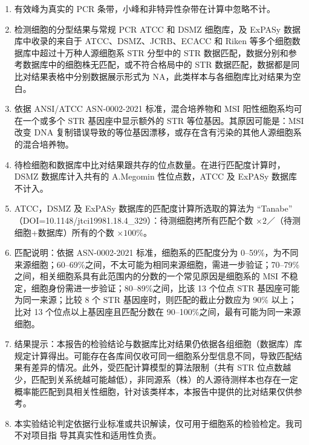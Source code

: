 \documentclass[UTF8,10pt,a4paper,fontset=fandol]{ctexart}
\begin{document}
\begin{enumerate}
  \item 有效峰为真实的 PCR 条带，小峰和非特异性杂带在计算中忽略不计。

  \item 检测细胞的分型结果与常规 PCR ATCC 和 DSMZ 细胞库，及 ExPASy 数据库中收录的来自于 ATCC、DSMZ、JCRB、ECACC 和 Riken 等多个细胞数据库中超过十万种人源细胞系 STR 分型中的 STR 数据匹配，数据分别和参考数据库中的细胞株无匹配，或不符合格局中的 STR 数据匹配，数据都是同比对结果表格中分别数据展示形式为 NA，此类样本与各细胞库比对结果为空白。

  \item 依据 ANSI/ATCC ASN-0002-2021 标准，混合培养物和 MSI 阳性细胞系均可在一个或多个 STR 基因座中显示额外的 STR 等位基因。其原因可能是：MSI 改变 DNA 复制错误导致的等位基因漂移，或存在含有污染的其他人源细胞系的混合培养物。

  \item 待检细胞和数据库中比对结果跟共存的位点数量。在进行匹配度计算时，DSMZ 数据库计入共有的 A.Megomin 性位点数，ATCC 及 ExPASy 数据库不计入。

  \item ATCC，DSMZ 及 ExPASy 数据库的匹配度计算所选取的算法为 “Tanabe”
  （DOI=10.1148/jtci19981.18.4_329）：待测细胞拷所有匹配个数 $\times 2$／（待测细胞+数据库）所有的个数 $\times 100\%$。

  \item 匹配说明：依据 ASN-0002-2021 标准，细胞系的匹配度分为 0--59\%，为不同来源细胞；60--69\%之间，不太可能为相同来源细胞，需进一步验证；70--79\%之间，相关细胞系具有此范围内的分数的一个常见原因是细胞系的 MSI 不稳定，细胞身份需进一步验证；80--89\%之间，比该 13 个位点 STR 基因座可能为同一来源；比较 8 个 STR 基因座时，则匹配的截止分数应为 90\% 以上；比对 13 个位点以上基因座且匹配分数在 90--100\%之间，最有可能为同一来源细胞。

  \item 结果提示：本报告的检验结论与数据库比对结果仍依据各组细胞（数据库）库规定计算得出。可能存在各库间仅收可同一细胞系分型信息不同，导致匹配结果有差异的情况。此外，受匹配计算模型的算法限制（共有 STR 位点数越少，匹配到关系统越可能越低），非同源系（株）的人源待测样本也存在一定概率能匹配到具相关性细胞，针对该类样本，本报告中提供的比对结果仅供参考。

  \item 本实验结论判定依据行业标准或共识解读，仅可用于细胞系的检验检定。我司不对项目指
导其真实性和适用性负责。
\end{enumerate}
\end{document}
